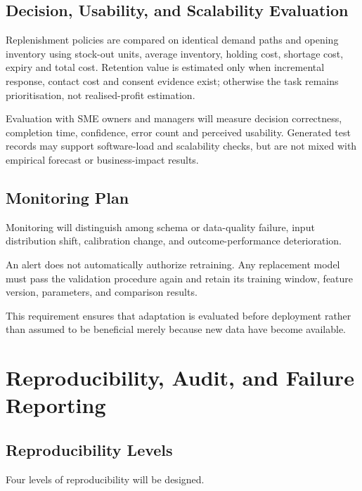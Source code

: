 \documentclass[a4paper,11pt,oneside]{book}
\theoremstyle{plain}
\theoremstyle{definition}
\theoremstyle{remark}
\begin{document}
\subsection{Decision, Usability, and Scalability Evaluation}
Replenishment policies are compared on identical demand paths and opening
inventory using stock-out units, average inventory, holding cost, shortage
cost, expiry and total cost. Retention value is estimated only when
incremental response, contact cost and consent evidence exist; otherwise
the task remains prioritisation, not realised-profit estimation.

Evaluation with SME owners and managers will measure decision correctness,
completion time, confidence, error count and perceived usability. Generated test records may support software-load
and scalability checks, but are not mixed with empirical forecast or
business-impact results.

\subsection{Monitoring Plan}
\label{subsec:monitoring_plan}

Monitoring will distinguish among schema or data-quality failure, input
distribution shift, calibration change, and outcome-performance deterioration.

An alert does not automatically authorize retraining. Any replacement model must
pass the validation procedure again and retain its training window, feature
version, parameters, and comparison results.

This requirement ensures that adaptation is evaluated before deployment rather
than assumed to be beneficial merely because new data have become available.


\section{Reproducibility, Audit, and Failure Reporting}
\label{sec:reproducibility_audit}

\subsection{Reproducibility Levels}
\label{subsec:reproducibility_levels}

Four levels of reproducibility will be designed.
\end{document}
